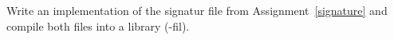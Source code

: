 \label{implementation}Write an implementation of the signatur file from Assignment~\ref{signature} and compile both files into a library (-fil).

